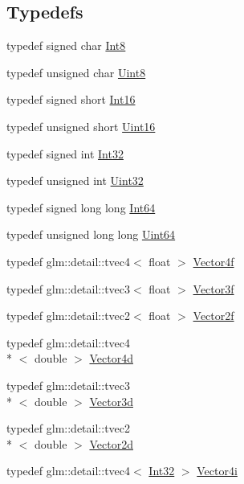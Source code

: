 \subsection*{Typedefs}
\begin{DoxyCompactItemize}
\item 
typedef signed char \hyperlink{namespaceburn_afbbb36f91c077b8633b194b8ec441fa4}{Int8}
\item 
typedef unsigned char \hyperlink{namespaceburn_a184b59a040b9ef0ce2833c36dcea7656}{Uint8}
\item 
typedef signed short \hyperlink{namespaceburn_acf6023d96a6c61f3baa1f26a5d13a7c5}{Int16}
\item 
typedef unsigned short \hyperlink{namespaceburn_ae0d8cb20051239cfa3dc71407cdef5e4}{Uint16}
\item 
typedef signed int \hyperlink{namespaceburn_a96c2e82d6da686c64a6f330628466b05}{Int32}
\item 
typedef unsigned int \hyperlink{namespaceburn_ab40b09022209bd449d317c1f0e95356b}{Uint32}
\item 
typedef signed long long \hyperlink{namespaceburn_a924776a36487e4c21d67322ac918f021}{Int64}
\item 
typedef unsigned long long \hyperlink{namespaceburn_a03c9a89b4bb9a4e0962f74ea7afdc557}{Uint64}
\item 
typedef glm\-::detail\-::tvec4$<$ float $>$ \hyperlink{namespaceburn_a58a411b9d83c7970518a9250c1c78068}{Vector4f}
\item 
typedef glm\-::detail\-::tvec3$<$ float $>$ \hyperlink{namespaceburn_afdd7cfb352b9612432faf6947b6fff74}{Vector3f}
\item 
typedef glm\-::detail\-::tvec2$<$ float $>$ \hyperlink{namespaceburn_af5ed9eb70cbf0fb572098ff43e146a0a}{Vector2f}
\item 
typedef glm\-::detail\-::tvec4\\*
$<$ double $>$ \hyperlink{namespaceburn_a7ef12007621667d3630580a881b8b924}{Vector4d}
\item 
typedef glm\-::detail\-::tvec3\\*
$<$ double $>$ \hyperlink{namespaceburn_a8832d94f1b12cd81bb8473a27a843930}{Vector3d}
\item 
typedef glm\-::detail\-::tvec2\\*
$<$ double $>$ \hyperlink{namespaceburn_a8ae93c5e897bdb83b7df8536308fb0e0}{Vector2d}
\item 
typedef glm\-::detail\-::tvec4$<$ \hyperlink{namespaceburn_a96c2e82d6da686c64a6f330628466b05}{Int32} $>$ \hyperlink{namespaceburn_ab917ea93d648ebd548923c709dba8b9b}{Vector4i}

\end{DoxyCompactItemize}
